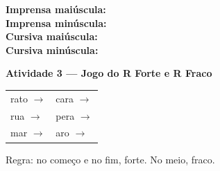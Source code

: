 \begin{consolidacao}
\begin{center}
\textbf{Imprensa mai\'uscula:} \underline{\hspace{1cm}} \underline{\hspace{1cm}} \underline{\hspace{1cm}} \underline{\hspace{1cm}} \underline{\hspace{1cm}}\\[0.5em]
\textbf{Imprensa min\'uscula:} \underline{\hspace{1cm}} \underline{\hspace{1cm}} \underline{\hspace{1cm}} \underline{\hspace{1cm}} \underline{\hspace{1cm}}\\[0.5em]
\textbf{Cursiva mai\'uscula:} \underline{\hspace{1cm}} \underline{\hspace{1cm}} \underline{\hspace{1cm}} \underline{\hspace{1cm}} \underline{\hspace{1cm}}\\[0.5em]
\textbf{Cursiva min\'uscula:} \underline{\hspace{1cm}} \underline{\hspace{1cm}} \underline{\hspace{1cm}} \underline{\hspace{1cm}} \underline{\hspace{1cm}}
\end{center}

\textbf{Atividade 3 --- Jogo do R Forte e R Fraco}


\begin{center}
\begin{tabular}{ll}
rato \quad $\rightarrow$ \underline{\hspace{2cm}} & cara \quad $\rightarrow$ \underline{\hspace{2cm}} \\
rua \quad $\rightarrow$ \underline{\hspace{2cm}} & pera \quad $\rightarrow$ \underline{\hspace{2cm}} \\
mar \quad $\rightarrow$ \underline{\hspace{2cm}} & aro \quad $\rightarrow$ \underline{\hspace{2cm}}
\end{tabular}
\end{center}
Regra: no come\c{c}o e no fim, forte. No meio, fraco.

\end{consolidacao}

